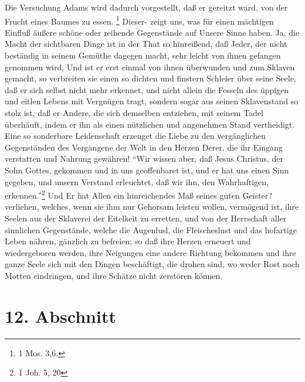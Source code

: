 \medskip

Die Versuchung Adams wird dadurch vorgestellt, daß er gereitzt ward, von der Frucht eines Baumes zu essen. \footnote{1 Mos. 3,6.} Dieser- zeigt uns, was für einen mächtigen Einfluß äußere schöne oder reihende Gegenstände auf Unsere Sinne haben. Ja, die Macht der sichtbaren Dinge ist in der That so hinreißend, daß Jeder, der nicht beständig in seinem Gemüthe dagegen macht, sehr leicht von ihnen gefangen genommen wird, Und ist er erst einmal von ihnen überwunden und zum Sklaven gemacht, so verbreiten sie einen so dichten und finstern Schleier über seine Seele, daß er sich selbst nicht mehr erkennet, und nicht allein die Fesseln des üppigen und eitlen Lebens mit Vergnügen tragt, sondern sogar aus seinen Sklavenstand so stolz ist, daß er Andere, die sich demselben entziehen, mit seinem Tadel überhäuft, indem er ihn als einen nützlichen und angenehmen Stand vertheidigt. Eine so sonderbare Leidenschaft erzeuget die Liebe zu den vergänglichen Gegenständen des Vergangene der Welt in den Herzen Derer, die ihr Eingang verstatten und Nahrung gewähren! "`Wir wissen aber, daß Jesus Christus, der Sohn Gottes, gekommen und in uns geoffenbaret ist, und er hat uns einen Sinn gegeben, und unsern Verstand erleuchtet, daß wir ihn, den Wahrhaftigen, erkennen."'\footnote{1 Joh. 5, 20} Und Er hat Allen ein hinreichendes Maß seines guten Geister? verliehen, welches, wenn sie ihm nur Gehorsam leisten wollen, vermögend ist, ihre Seelen aus der Sklaverei der Eitelkeit zu erretten, und von der Herrschaft aller sinnlichen Gegenstände, welche die Augenlusl, die Fleischeslust und das hofartige Leben nähren, gänzlich zu befreien; so daß ihre Herzen erneuert und wiedergeboren werden, ihre Neigungen eine andere Richtung bekommen und ihre ganze Seele sich mit den Dingen beschäftigt, die drohen sind, wo weder Rost noch Motten eindringen, und ihre Schätze nicht zerstören können.

\section{12. Abschnitt}

